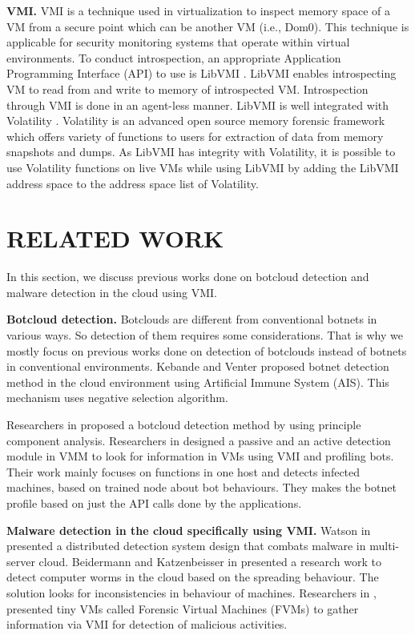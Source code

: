 \documentclass[conference]{IEEEtran}
\begin{document}
\textbf{VMI.}
VMI is a technique used in virtualization to inspect memory space of a VM from a secure point which can be another VM (i.e., Dom0). This technique is applicable for security monitoring systems that operate within virtual environments. To conduct introspection, an appropriate Application Programming Interface (API) to use is LibVMI \cite{ref11}. LibVMI enables introspecting VM to read from and write to memory of introspected VM. Introspection through VMI is done in an agent-less manner. LibVMI is well integrated with Volatility \cite{ref19}. Volatility is an advanced open source memory forensic framework which offers variety of functions to users for extraction of data from memory snapshots and dumps. As LibVMI has integrity with Volatility, it is possible to use Volatility functions on live VMs while using LibVMI by adding the LibVMI address space to the address space list of Volatility.

\section{RELATED WORK}
In this section, we discuss previous works done on botcloud detection and malware detection in the cloud using VMI.
 
\textbf{Botcloud detection.}
Botclouds are different from conventional botnets in various ways. So detection of them requires some considerations. That is why we mostly focus on previous works done on detection of botclouds instead of botnets in conventional environments. Kebande and Venter \cite{ref3} proposed botnet detection method in the cloud environment using Artificial Immune System (AIS). This mechanism uses negative selection algorithm. 

Researchers in \cite{ref41} proposed a botcloud detection method by using principle component analysis. Researchers in \cite{ref4} designed a passive and an active detection module in VMM to look for information in VMs using VMI and profiling bots. Their work mainly focuses on functions in one host and detects infected machines, based on trained node about bot behaviours. They makes the botnet profile based on just the API calls done by the applications. 

\textbf{Malware detection in the cloud specifically using VMI.} 
Watson in \cite{ref13} presented a distributed detection system design that combats malware in multi-server cloud. Beidermann and Katzenbeisser in \cite{ref12} presented a research work to detect computer worms in the cloud based on the spreading behaviour. The solution looks for inconsistencies in behaviour of machines. Researchers in \cite{ref7}, presented tiny VMs called Forensic Virtual Machines (FVMs) to gather information via VMI for detection of malicious activities. 
\end{document}
